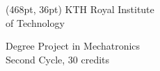 \makeatletter
\begin{titlepage}
    
    \thispagestyle{empty}
    \begin{textblock*}{120pt}(468pt, 36pt) %
    \colvillebold \small KTH Royal Institute \\of Technology
    \end{textblock*}
    
     
    \vspace*{-5\baselineskip}
    \begin{flushleft}
    \fontsize{14}{13}\upshape Degree Project in Mechatronics \\
    \vspace{8pt}
    \upshape Second Cycle, 30 credits ~\\
    \vspace{40pt}
    {\fontsize{25}{20}\bf\sffamily\@title\\}
    \vspace{30pt}
    {\fontsize{20}{18}\sffamily \@author\\}
    \end{flushleft}
    

\end{titlepage}
